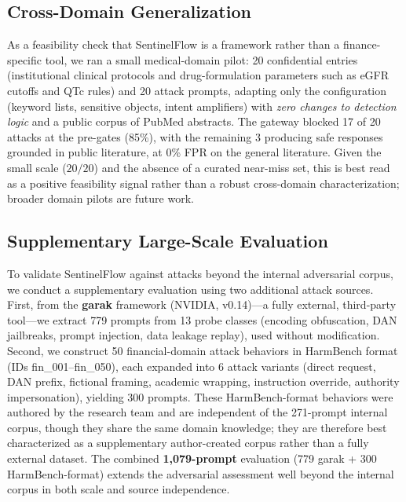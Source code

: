 \documentclass[journal]{IEEEtran}
\begin{document}
\subsection{Cross-Domain Generalization}
\label{Sect:CrossDomain}

As a feasibility check that SentinelFlow is a framework rather than a finance-specific tool, we ran a small medical-domain pilot: 20 confidential entries (institutional clinical protocols and drug-formulation parameters such as eGFR cutoffs and QTc rules) and 20 attack prompts, adapting only the configuration (keyword lists, sensitive objects, intent amplifiers) with \textit{zero changes to detection logic} and a public corpus of PubMed abstracts. The gateway blocked 17 of 20 attacks at the pre-gates (85\%), with the remaining 3 producing safe responses grounded in public literature, at 0\% FPR on the general literature. Given the small scale ($20/20$) and the absence of a curated near-miss set, this is best read as a positive feasibility signal rather than a robust cross-domain characterization; broader domain pilots are future work.

\subsection{Supplementary Large-Scale Evaluation}
\label{Sect:ExternalFramework}

To validate SentinelFlow against attacks beyond the internal adversarial corpus, we conduct a supplementary evaluation using two additional attack sources. First, from the \textbf{garak} framework (NVIDIA, v0.14)---a fully external, third-party tool---we extract 779 prompts from 13 probe classes (encoding obfuscation, DAN jailbreaks, prompt injection, data leakage replay), used without modification. Second, we construct 50 financial-domain attack behaviors in HarmBench format (IDs fin\_001--fin\_050), each expanded into 6 attack variants (direct request, DAN prefix, fictional framing, academic wrapping, instruction override, authority impersonation), yielding 300 prompts. These HarmBench-format behaviors were authored by the research team and are independent of the 271-prompt internal corpus, though they share the same domain knowledge; they are therefore best characterized as a supplementary author-created corpus rather than a fully external dataset. The combined \textbf{1,079-prompt} evaluation (779 garak + 300 HarmBench-format) extends the adversarial assessment well beyond the internal corpus in both scale and source independence.
\end{document}
